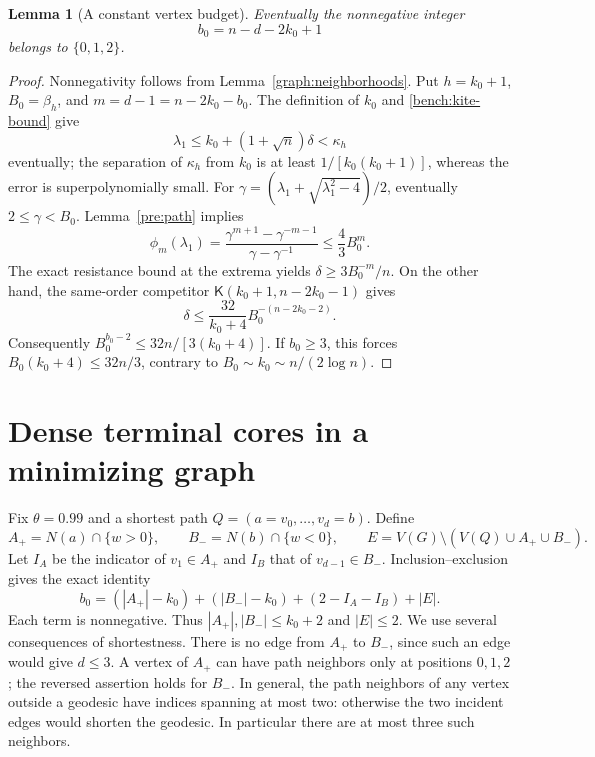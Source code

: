 \documentclass[11pt,a4paper]{article}
\numberwithin{equation}{section}
\newtheorem{lemma}[theorem]{Lemma}
\theoremstyle{definition}
\theoremstyle{remark}
\newcommand{\Kite}{\mathsf{K}}
\begin{document}
\begin{lemma}[A constant vertex budget]\label{graph:slack}
Eventually the nonnegative integer
\[
 b_0=n-d-2k_0+1
\]
belongs to $\{0,1,2\}$.
\end{lemma}
\begin{proof}
Nonnegativity follows from Lemma~\ref{graph:neighborhoods}. Put
$h=k_0+1$, $B_0=\beta_h$, and $m=d-1=n-2k_0-b_0$.
The definition of $k_0$ and \eqref{bench:kite-bound} give
\[
 \lambda_1\le k_0+(1+\sqrt n)\delta<\kappa_h
\]
eventually; the separation of $\kappa_h$ from $k_0$ is at least
$1/[k_0(k_0+1)]$, whereas the error is superpolynomially small.
For $\gamma=(\lambda_1+\sqrt{\lambda_1^2-4})/2$, eventually
$2\le\gamma<B_0$. Lemma~\ref{pre:path} implies
\[
 \phi_m(\lambda_1)
 =\frac{\gamma^{m+1}-\gamma^{-m-1}}{\gamma-\gamma^{-1}}
 \le\frac43 B_0^m.
\]
The exact resistance bound at the extrema yields
$\delta\ge3B_0^{-m}/n$. On the other hand, the same-order competitor
$\Kite(k_0+1,n-2k_0-1)$ gives
\[
 \delta\le\frac{32}{k_0+4}B_0^{-(n-2k_0-2)}.
\]
Consequently $B_0^{b_0-2}\le32n/[3(k_0+4)]$. If $b_0\ge3$, this
forces $B_0(k_0+4)\le32n/3$, contrary to
$B_0\sim k_0\sim n/(2\log n)$.
\end{proof}

\section{Dense terminal cores in a minimizing graph}
\label{sec:graph-cores}

Fix $\theta=0.99$ and a shortest path $Q=(a=v_0,\ldots,v_d=b)$.
Define
\[
 A_+=N(a)\cap\{w>0\},\qquad B_-=N(b)\cap\{w<0\},\qquad
 E=V(G)\setminus(V(Q)\cup A_+\cup B_-).
\]
Let $I_A$ be the indicator of $v_1\in A_+$ and $I_B$ that of
$v_{d-1}\in B_-$. Inclusion--exclusion gives the exact identity
\begin{equation}\label{graph:count}
 b_0=(|A_+|-k_0)+(|B_-|-k_0)+(2-I_A-I_B)+|E|.
\end{equation}
Each term is nonnegative. Thus $|A_+|,|B_-|\le k_0+2$ and $|E|\le2$.
We use several consequences of shortestness. There is no edge from
$A_+$ to $B_-$, since such an edge would give $d\le3$.
A vertex of $A_+$ can have path neighbors only at positions $0,1,2$;
the reversed assertion holds for $B_-$. In general, the path neighbors
of any vertex outside a geodesic have indices spanning at most two:
otherwise the two incident edges would shorten the geodesic. In
particular there are at most three such neighbors.
\end{document}
